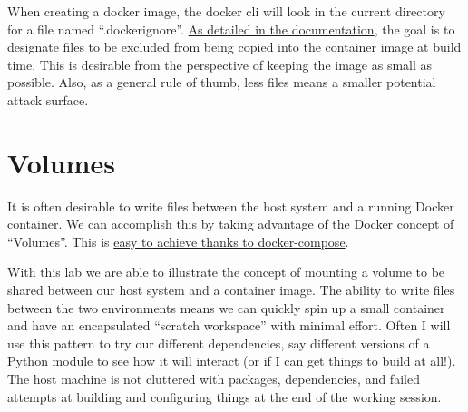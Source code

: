 \justifying
When creating a docker image, the docker cli will look in the current directory for a file named ``.dockerignore''. \href{https://docs.docker.com/engine/reference/builder/#dockerignore-file}{As detailed in the documentation}, the goal is to designate files to be excluded from being copied into the container image
at build time. This is desirable from the perspective of keeping the image as small as possible. Also, as
a general rule of thumb, less files means a smaller potential attack surface.




\section{Volumes}

It is often desirable to write files between the host system and a running Docker container. We can accomplish this by taking advantage of the Docker concept of ``Volumes''. This is \href{https://docs.docker.com/storage/volumes/#use-a-volume-with-docker-compose}{easy to achieve thanks to docker-compose}.


\justifying
With this lab we are able to illustrate the concept of mounting a volume to be shared between our host system and a
container image. The ability to write files between the two environments means we can quickly spin up a small container and have an
encapsulated ``scratch workspace'' with minimal effort. Often I will use this pattern to try our different dependencies, say
different versions of a Python module to see how it will interact (or if I can get things to build at all!). The host machine is
not cluttered with packages, dependencies, and failed attempts at building and configuring things at the end of the working
session.

